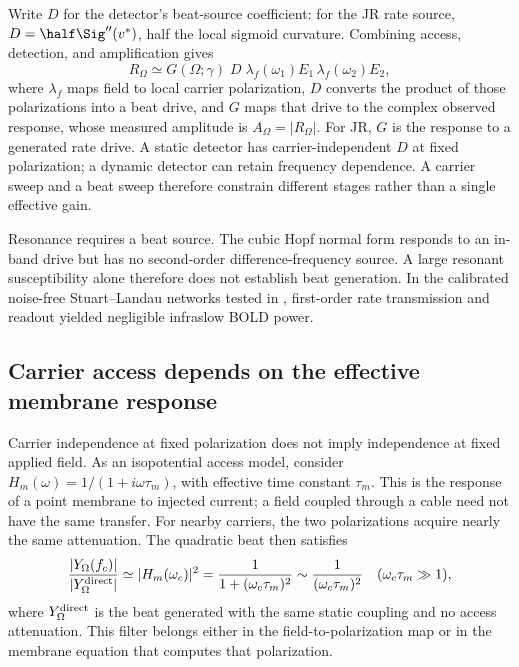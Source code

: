 Write $D$ for the detector's beat-source coefficient: for the JR rate source,
$D=\half\Sig''(v^*)$, half the local sigmoid curvature. Combining access,
detection, and amplification gives
\begin{equation}
R_\Omega\simeq G(\Omega;\gamma)\;D\;\lambda_f(\omega_1)E_1\,\lambda_f(\omega_2)E_2 ,
\label{eq:receiver}
\end{equation}
\makeatletter\begingroup\edef\@currentlabel{\theequation}\label{eq:spatial}\endgroup\makeatother
where $\lambda_f$ maps field to local carrier polarization, $D$ converts the
product of those polarizations into a beat drive, and $G$ maps that drive to the
complex observed response, whose measured amplitude is $A_\Omega=|R_\Omega|$.
For JR, $G$ is the response to a generated rate drive.
A static detector has carrier-independent $D$ at fixed polarization;
a dynamic detector can retain frequency dependence. A carrier sweep and a beat sweep
therefore constrain different stages rather than a single effective gain.

Resonance requires a beat source. The cubic Hopf normal form
responds to an in-band drive but has no second-order difference-frequency source. A large resonant susceptibility alone therefore does not
establish beat generation.
In the calibrated noise-free Stuart--Landau networks tested in \cite{Ruffini2026iso},
first-order rate transmission and readout yielded negligible infraslow BOLD power.

\subsection{Carrier access depends on the effective membrane response}\label{sec:khz}
Carrier independence at fixed polarization does not imply independence at fixed
applied field. As an isopotential access model, consider
$H_m(\omega)=1/(1+i\omega\tau_m)$, with effective time constant $\tau_m$.
This is the response of a point membrane to injected current; a field coupled
through a cable need not have the same transfer.
For nearby carriers, the two polarizations acquire nearly the same attenuation.
The quadratic beat then satisfies
\begin{equation}
\frac{|Y_\Omega(f_c)|}{|Y_\Omega^{\rm direct}|}
\simeq |H_m(\omega_c)|^2
=\frac{1}{1+(\omega_c\tau_m)^2}
\sim\frac{1}{(\omega_c\tau_m)^2}
\quad(\omega_c\tau_m\gg1),
\label{eq:khz}
\end{equation}
where $Y_\Omega^{\rm direct}$ is the beat generated with the same static coupling
and no access attenuation. This filter belongs either in the field-to-polarization
map or in the membrane equation that computes that polarization.

